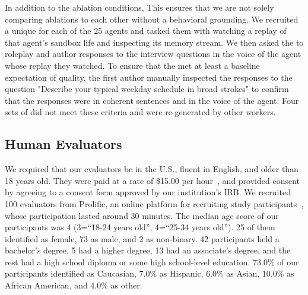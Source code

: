 In addition to the ablation conditions, {\color{black}{we added a condition with human crowdworker-authored behavior intended to provide a human baseline. We do not intend this baseline to capture maximal human expert performance; instead, we aim to use this condition to identify whether the architecture meets a basic level of behavioral competency.}} This ensures that we are not solely comparing ablations to each other without a behavioral grounding. We recruited a unique {\color{black}{worker}} for each of the 25 agents and tasked them with watching a replay of that agent's sandbox life and inspecting its memory stream. We then asked the {\color{black}{workers}} to roleplay and author responses to the interview questions in the voice of the agent whose replay they watched. To ensure that the {\color{black}{crowdworker-authored responses}} met at least a baseline expectation of quality, the first author manually inspected the {\color{black}{workers'}} responses to the question "Describe your typical weekday schedule in broad strokes" to confirm that the responses were in coherent sentences and in the voice of the agent. Four sets of {\color{black}{crowdworker-authored responses}} did not meet these criteria and were re-generated by other workers.

\subsection{Human Evaluators} We required that our evaluators be in the U.S., fluent in English, and older than 18 years old. They were paid at a rate of \$15.00 per hour~\cite{16_rolf2015fight}, and provided consent by agreeing to a consent form approved by our institution’s IRB. We recruited 100 evaluators from Prolific, an online platform for recruiting study participants~\cite{17_prolific2022}, whose participation lasted around 30 minutes. The median age score of our participants was 4 (3=``18-24 years old'', 4=``25-34 years old''). 25 of them identified as female, 73 as male, and 2 as non-binary. 42 participants held a bachelor's degree, 5 had a higher degree, 13 had an associate's degree, and the rest had a high school diploma or some high school-level education. 73.0\% of our participants identified as Caucasian, 7.0\% as Hispanic, 6.0\% as Asian, 10.0\% as African American, and 4.0\% as other. 

